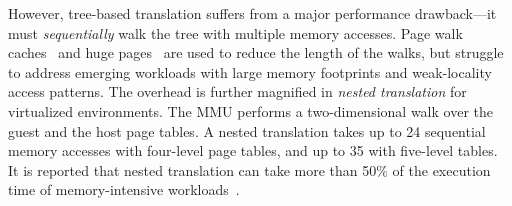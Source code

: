 However, tree-based translation suffers from a major performance drawback---it 
	must {\it sequentially} walk the tree with multiple 
	memory accesses.
Page walk caches~\cite{barr2010translation,park2022fpt,bhattacharjee2013lmm} 
	and huge pages~\cite{navarro2002practical,kwon2016coordinated} are used to reduce the length of the walks,
	but struggle to address 
	emerging workloads with large memory footprints 
	and weak-locality access patterns.
The overhead %
	is further magnified 
	in {\it nested translation} for virtualized environments.
The MMU performs a two-dimensional walk over the guest and the host page tables.
A nested translation takes up to 24 sequential memory accesses with four-level page tables, 
	and up to 35 with five-level tables. 
It is reported that nested translation can take more than 50\% 
	of the execution time of memory-intensive workloads~\cite{alam2017doityourself,gandhi2016agile,margaritov2019asap}.
	




